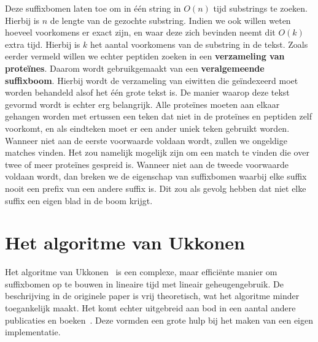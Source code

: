 Deze suffixbomen laten toe om in één string in $O(n)$ tijd substrings te zoeken.
Hierbij is $n$ de lengte van de gezochte substring.
Indien we ook willen weten hoeveel voorkomens er exact zijn, en waar deze zich bevinden neemt dit $O(k)$ extra tijd.
Hierbij is $k$ het aantal voorkomens van de substring in de tekst.
Zoals eerder vermeld willen we echter peptiden zoeken in een \textbf{verzameling van proteïnes}.
Daarom wordt gebruikgemaakt van een \textbf{veralgemeende suffixboom}.
Hierbij wordt de verzameling van eiwitten die geïndexeerd moet worden behandeld alsof het één grote tekst is.
De manier waarop deze tekst gevormd wordt is echter erg belangrijk.
Alle proteïnes moeten aan elkaar gehangen worden met ertussen een teken dat niet in de proteïnes en peptiden zelf voorkomt, en als eindteken moet er een ander uniek teken gebruikt worden.
Wanneer niet aan de eerste voorwaarde voldaan wordt, zullen we ongeldige matches vinden.
Het zou namelijk mogelijk zijn om een match te vinden die over twee of meer proteïnes gespreid is.
Wanneer niet aan de tweede voorwaarde voldaan wordt, dan breken we de eigenschap van suffixbomen waarbij elke suffix nooit een prefix van een andere suffix is.
Dit zou als gevolg hebben dat niet elke suffix een eigen blad in de boom krijgt.

\section{Het algoritme van Ukkonen}\label{sec:Ukkonen}
Het algoritme van Ukkonen~\cite{Ukkonen1995} is een complexe, maar efficiënte manier om suffixbomen op te bouwen in lineaire tijd met lineair geheugengebruik.
De beschrijving in de originele paper is vrij theoretisch, wat het algoritme minder toegankelijk maakt.
Het komt echter uitgebreid aan bod in een aantal andere publicaties en boeken~\cite{Gusfield1997, AD3_ukkonen, CCB_course, Ukkonen_CCB}.
Deze vormden een grote hulp bij het maken van een eigen implementatie.

